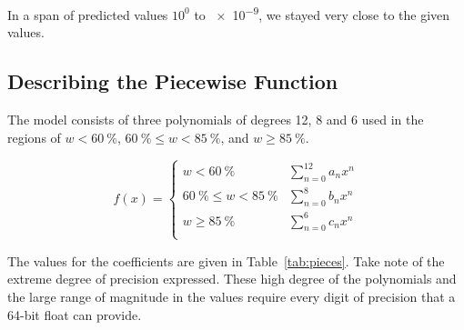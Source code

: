 \documentclass[]{tufte-handout}
\begin{document}
In a span of predicted values $10^0$ to \num{e-9}, we stayed very close to the given values. 

\subsection{Describing the Piecewise Function}

The model consists of three polynomials of degrees 12, 8 and 6 used in the regions of $w<\qty{60}{\percent}$, $\qty{60}{\percent} \le w < \qty{85}{\percent}$, and $w \ge \qty{85}{\percent}$.

\begin{equation} 
f(x) = \begin{cases}
    w<\qty{60}{\percent} & \displaystyle\sum_{n=0}^{12} a_n x^n \\
    \qty{60}{\percent} \le w < \qty{85}{\percent} & \displaystyle\sum_{n=0}^{8} b_n x^n \\
    w \ge \qty{85}{\percent} & \displaystyle\sum_{n=0}^{6} c_n x^n \\
\end{cases}
\end{equation}

The values for the coefficients are given in Table~\vref{tab:pieces}. Take note of the extreme degree of precision expressed. These high degree of the polynomials and the large range of magnitude in the values require every digit of precision that a 64-bit float can provide.
\end{document}
